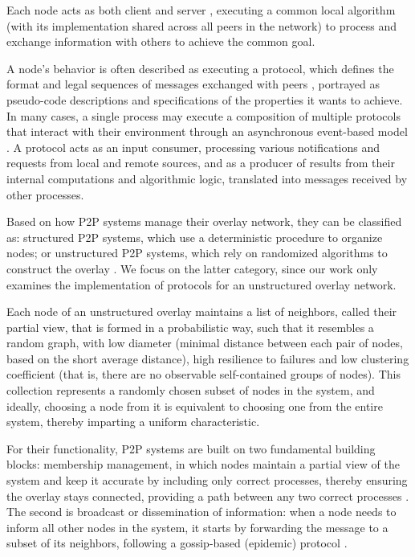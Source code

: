 \documentclass[sigconf,a4paper]{acmart}
\begin{document}
Each node acts as both client and server \cite{distributed_systems_principles_and_paradigms_2nd_edition}, 
executing a common local algorithm \cite{introduction-to-reliable-and-secure-distributed-programming} 
(with its implementation shared across all peers in the network) to process and exchange information 
with others to achieve the common goal.

A node's behavior is often described as executing a protocol, which defines the format and legal 
sequences of messages exchanged with peers \cite{introduction-to-reliable-and-secure-distributed-programming}, portrayed 
as pseudo-code descriptions and specifications of the properties it wants to achieve. In many cases, a single process may execute a 
composition of multiple protocols \cite{babel_framework} that interact with their environment through an asynchronous 
event-based model \cite{distributed_systems_principles_and_paradigms_2nd_edition}. A protocol acts as an input consumer, processing various notifications and requests 
from local and remote sources, and as a producer of results from their internal computations and algorithmic 
logic, translated into messages received by other processes.

Based on how P2P systems manage their overlay network, they can be classified as: 
structured P2P systems, which use a deterministic procedure to organize nodes; 
or unstructured P2P systems, which rely on randomized algorithms to construct the overlay \cite{cyclon}. 
We focus on the latter category, since our work only examines the implementation of protocols for an 
unstructured overlay network.

Each node of an unstructured overlay maintains a list of neighbors, called their partial view, 
that is formed in a probabilistic way, such that it resembles a random graph, with low diameter 
(minimal distance between each pair of nodes, based on the short average distance), high resilience to 
failures and low clustering coefficient (that is, there are no observable self-contained groups of nodes). 
This collection represents a randomly chosen subset of nodes in the system, and ideally, choosing a node from 
it is equivalent to choosing one from the entire system, thereby imparting a uniform characteristic. \cite{distributed_systems_principles_and_paradigms_2nd_edition,cyclon}

For their functionality, P2P systems are built on two fundamental building blocks: 
membership management, in which nodes maintain a partial view of the system and keep it accurate by 
including only correct processes, thereby ensuring the overlay stays connected, providing a 
path between any two correct processes \cite{hyparview}. The second is broadcast or dissemination of information: 
when a node needs to inform all other nodes in the system, it starts by forwarding the message to a 
subset of its neighbors, following a gossip-based (epidemic) protocol \cite{distributed_systems_principles_and_paradigms_2nd_edition}.
\end{document}
